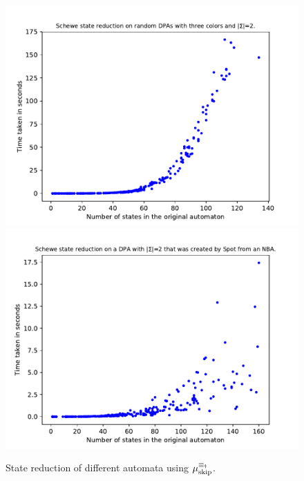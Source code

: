 \begin{figure}
\begin{minipage}{0.49\textwidth}
		\caption{State reduction of different automata using $\mu_\text{skip}^{\equiv_\text{\Ankh}}$.}
		\label{fig:schewe:empirical_size_hist}
	\end{minipage}
	\hfill
	\begin{minipage}{0.49\textwidth}
		\includegraphics[page=2,height=.3\textheight]{../data/analysis/schewe/gendet_ap1.pdf} 
		\includegraphics[page=2,height=.3\textheight]{../data/analysis/schewe/detspot_ap1.pdf} 

\end{minipage}
\end{figure}
